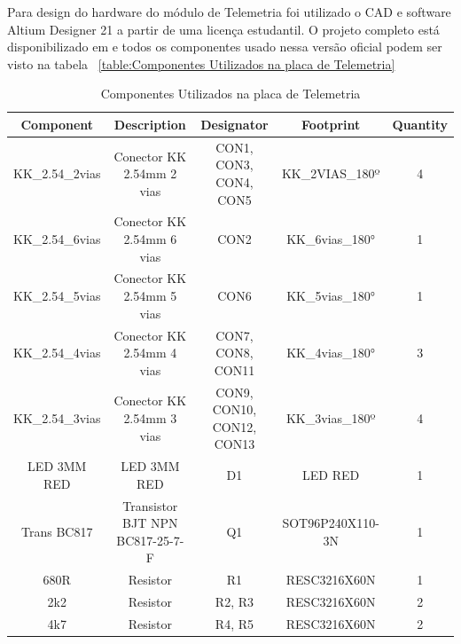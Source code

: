 \documentclass[../delivery_hospital_report.tex]{subfiles}
\begin{document}
Para design do hardware do módulo de Telemetria foi utilizado o CAD e software Altium Designer 21 \cite{altium21} a partir de uma licença estudantil. O projeto completo está disponibilizado em \cite{github_modulos} e todos os componentes usado nessa versão oficial podem ser visto na tabela ~\ref{table:Componentes Utilizados na placa de Telemetria}

\begin{table}[!h]
\caption{Componentes Utilizados na placa de Telemetria}
\centering
\begin{adjustbox}{width=\columnwidth,center}
\begin{tabular}{|c|c|c|c|c|}

\hline
Component        & Description                                    & Designator                  & Footprint           & Quantity \\ \hline
KK\_2.54\_2vias  & Conector KK 2.54mm 2   vias                    & CON1, CON3, CON4,   CON5    & KK\_2VIAS\_180º     & 4        \\ \hline
KK\_2.54\_6vias  & Conector KK 2.54mm 6   vias                    & CON2                        & KK\_6vias\_180°     & 1        \\ \hline
KK\_2.54\_5vias  & Conector KK 2.54mm 5   vias                    & CON6                        & KK\_5vias\_180°     & 1        \\ \hline
KK\_2.54\_4vias  & Conector KK 2.54mm 4   vias                    & CON7, CON8, CON11           & KK\_4vias\_180°     & 3        \\ \hline
KK\_2.54\_3vias  & Conector KK 2.54mm 3   vias                    & CON9, CON10, CON12,   CON13 & KK\_3vias\_180º     & 4        \\ \hline
LED 3MM RED      & LED 3MM RED                                    & D1                          & LED RED             & 1        \\ \hline
Trans BC817      & Transistor BJT NPN   BC817-25-7-F              & Q1                          & SOT96P240X110-3N    & 1        \\ \hline
680R             & Resistor                                       & R1                          & RESC3216X60N        & 1        \\ \hline
2k2              & Resistor                                       & R2, R3                      & RESC3216X60N        & 2        \\ \hline
4k7              & Resistor                                       & R4, R5                      & RESC3216X60N        & 2        \\ \hline

\end{tabular}
\end{adjustbox}
\end{table}
\end{document}
